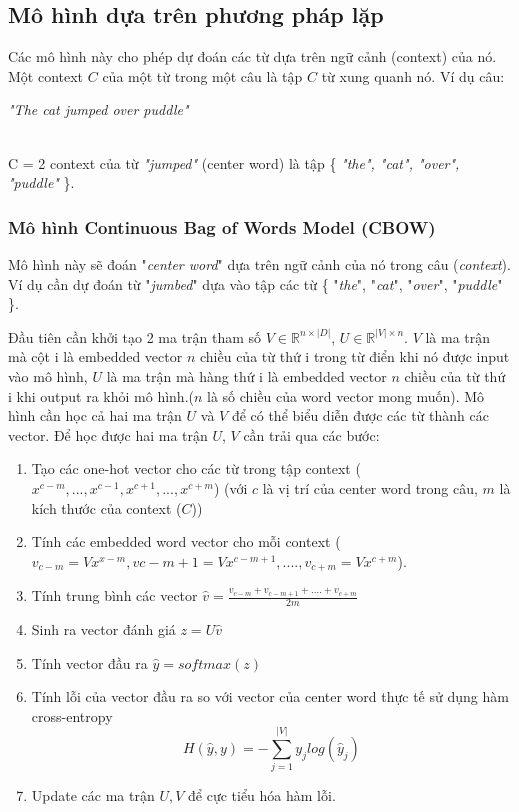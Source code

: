 \documentclass[a4paper,12pt]{report}
\begin{document}
\subsection{Mô hình dựa trên phương pháp lặp}
Các mô hình này cho phép dự đoán các từ dựa trên ngữ cảnh (context) của nó. Một context $C$ của một từ trong một câu là tập $C$ từ xung quanh nó. Ví dụ câu:\\
\centerline{\emph{"The cat jumped over puddle"}}\\[0.2cm]
C = 2 context của từ \emph{"jumped"} (center word) là tập \{ \emph{"the", "cat", "over", "puddle"} \}.

\subsubsection{Mô hình Continuous Bag of Words Model (CBOW)}
Mô hình này sẽ đoán "\emph{center word}" dựa trên ngữ cảnh của nó trong câu (\emph{context}). Ví dụ cần dự đoán từ "\emph{jumbed}" dựa vào tập các từ \{ "\emph{the}", "\emph{cat}", "\emph{over}", "\emph{puddle}" \}.
\par Đầu tiên cần khởi tạo 2 ma trận tham số $V \in \mathbb{R}^{n \times |D|}$, $U \in \mathbb{R}^{|V| \times n}$. $V$ là ma trận mà cột i là embedded vector $n$ chiều của từ thứ i trong từ điển khi nó được input vào mô hình, $U$ là ma trận mà hàng thứ i là embedded vector $n$ chiều của từ thứ i khi output ra khỏi mô hình.($n$ là số chiều của word vector mong muốn). Mô hình cần học cả hai ma trận $U$ và $V$ để có thể biểu diễn được các từ thành các vector. Để học được hai ma trận $U$, $V$ cần trải qua các bước: 
\begin{enumerate}
\item Tạo các one-hot vector cho các từ trong tập context ($x^{c-m}, ..., x^{c-1}, x^{c+1}, ..., x^{c+m}$) (với $c$ là vị trí của center word trong câu, $m$ là kích thước của context ($C$))
\item Tính các embedded word vector cho mỗi context ($v_{c-m} = Vx^{x-m}, v{c-m+1} = Vx^{c-m+1}, ...., v_{c+m} = Vx^{c+m}$).
\item Tính trung bình các vector $\hat{v} = \frac{v_{c-m} + v_{c-m+1} + .... + v_{c+m}}{2m}$
\item Sinh ra vector đánh giá $z = U\hat{v}$
\item Tính vector đầu ra $\hat{y} = softmax(z)$
\item Tính lỗi của vector đầu ra so với vector của center word thực tế sử dụng hàm cross-entropy
$$H(\hat{y},y) = -\sum_{j=1}^{|V|} y_jlog(\hat{y}_j)$$
\item Update các ma trận $U, V$ để cực tiểu hóa hàm lỗi.
\end{enumerate}
\end{document}
